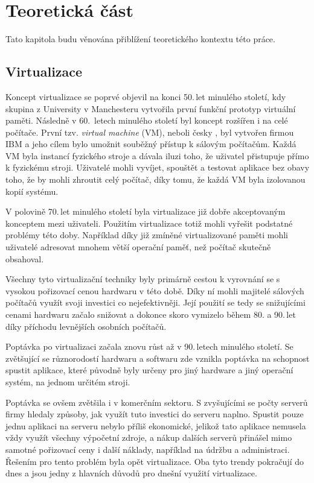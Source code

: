 \chapter{Teoretická část}\label{chap:teorie}

Tato kapitola budu věnována přiblížení teoretického kontextu této práce.

\section{Virtualizace}

Koncept virtualizace se poprvé objevil na konci 50.\,let minulého století, kdy skupina z University v Manchesteru vytvořila první funkční prototyp virtuální paměti. Následně v 60.\, letech minulého století byl koncept rozšířen i na celé počítače. První tzv. \textit{virtual machine} (VM), neboli česky , byl vytvořen firmou IBM a jeho cílem bylo umožnit souběžný přístup k sálovým počítačům. Každá VM byla instancí fyzického stroje a dávala iluzi toho, že uživatel přistupuje přímo k fyzickému stroji. Uživatelé mohli vyvíjet, spouštět a testovat aplikace bez obavy toho, že by mohli zhroutit celý počítač, díky tomu, že každá VM byla izolovanou kopií systému. 

V polovině 70.\,let minulého století byla virtualizace již dobře akceptovaným konceptem mezi uživateli. Použitím virtualizace totiž mohli vyřešit podstatné problémy této doby. Například díky již zmíněné virtualizované paměti mohli uživatelé adresovat mnohem větší operační paměť, než počítač skutečně obsahoval. 

Všechny tyto virtualizační techniky byly primárně cestou k vyrovnání se s vysokou pořizovací cenou hardwaru v této době. Díky ní mohli majitelé sálových počítačů využít svoji investici co nejefektivněji. Její použití se tedy se snižujícími cenami hardwaru začalo snižovat a dokonce skoro vymizelo během 80. a 90.\,let díky příchodu levnějších osobních počítačů.  

Poptávka po virtualizaci začala znovu růst až v 90.\,letech minulého století. Se zvětšující se různorodostí hardwaru a softwaru zde vznikla poptávka na schopnost spustit aplikace, které původně byly určeny pro jiný hardware a jiný operační systém, na jednom určitém stroji. 

Poptávka se ovšem zvětšila i v komerčním sektoru. S zvyšujícími se počty serverů firmy hledaly způsoby, jak využít tuto investici do serveru naplno. Spustit pouze jednu aplikaci na serveru nebylo příliš ekonomické, jelikož tato aplikace nemusela vždy využít všechny výpočetní zdroje, a nákup dalších serverů přinášel mimo samotné pořizovací ceny i další náklady, například na údržbu a administraci. Řešením pro tento problém byla opět virtualizace. Oba tyto trendy pokračují do dnes a jsou jedny z hlavních důvodů pro dnešní využití virtualizace. 

